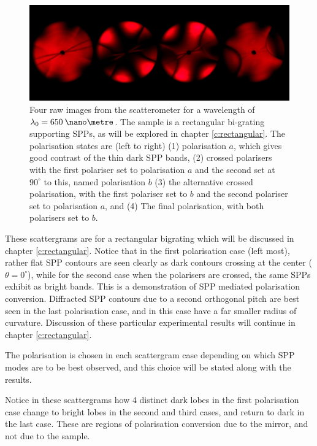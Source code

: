 \begin{figure}
\begin{center}
\includegraphics[width=1\linewidth]{exampleofpolairsation-banner}
\end{center}
\caption[Four raw images from the scatterometer for a wavelength of $\lambda_0=650\:\nano\metre$ with different polarisations.]{Four raw images from the scatterometer for a wavelength of $\lambda_0=650\:\nano\metre$. The sample is a rectangular bi-grating supporting SPPs, as will be explored in chapter \ref{c:rectangular}. The polarisation states are (left to right) (1) polarisation $a$, which gives good contrast of the thin dark SPP bands, (2) crossed polarisers with the first polariser set to polarisation $a$ and the second set at $90^\circ$ to this, named polarisation $b$ (3) the alternative crossed polarisation, with the first polariser set to $b$ and the second polariser set to polarisation $a$, and (4) The final polarisation, with both polarisers set to $b$.\label{fig:exp-pol}}
\end{figure} 

These scattergrams are for a rectangular bigrating which will be discussed in chapter \ref{c:rectangular}. Notice that in the first polarisation case (left most), rather flat SPP contours are seen clearly as dark contours crossing at the center ($\theta=0^\circ$), while for the second case when the polarisers are crossed, the same SPPs exhibit as bright bands. This is a demonstration of SPP mediated polarisation conversion\cite{Bryan-Brown1990}. Diffracted SPP contours due to a second orthogonal pitch are best seen in the last polarisation case, and in this case have a far smaller radius of curvature. Discussion of these particular experimental results will continue in chapter \ref{c:rectangular}.

The polarisation is chosen in each scattergram case depending on which SPP modes are to be best observed, and this choice will be stated along with the results.

Notice in these scattergrams how 4 distinct dark lobes in the first polarisation case change to bright lobes in the second and third cases, and return to dark in the last case. These are regions of polarisation conversion due to the mirror, and not due to the sample.

